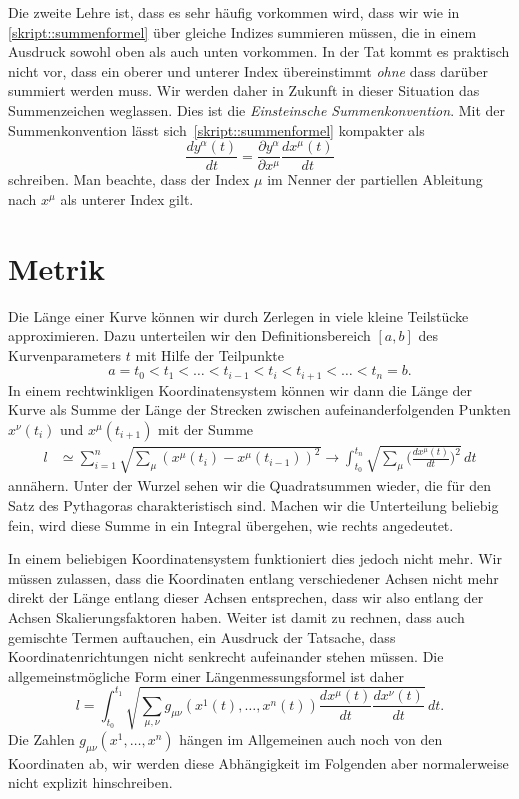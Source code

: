 Die zweite Lehre ist, dass es sehr häufig vorkommen wird, dass wir
wie in 
\eqref{skript::summenformel}
über gleiche Indizes summieren müssen, die in einem Ausdruck sowohl
oben als auch unten vorkommen.
In der Tat kommt es praktisch nicht vor, dass ein oberer und unterer
Index übereinstimmt {\em ohne} dass darüber summiert werden muss.
Wir werden daher in Zukunft in dieser Situation das Summenzeichen weglassen.
Dies ist die {\em Einsteinsche Summenkonvention}.
%
Mit der Summenkonvention lässt sich~\eqref{skript::summenformel} kompakter
als
\begin{equation}
\frac{dy^\alpha(t)}{dt}
=
\frac{\partial y^\alpha}{\partial x^\mu}\frac{dx^\mu(t)}{dt}
\end{equation}
schreiben.
Man beachte, dass der Index $\mu$ im Nenner der partiellen Ableitung nach
$x^\mu$ als unterer Index gilt.

%
%
\section{Metrik%
\label{skript:laengenmessung:section:metrik}}
Die Länge einer Kurve können wir durch Zerlegen in viele kleine Teilstücke
approximieren.
Dazu unterteilen wir den Definitionsbereich $[a,b]$ des Kurvenparameters $t$
mit Hilfe der Teilpunkte
\[
a = t_0 < t_1 < \dots < t_{i-1} < t_i < t_{i+1} < \dots < t_n = b.
\]
In einem rechtwinkligen Koordinatensystem können wir dann die Länge
der Kurve als Summe der Länge der Strecken zwischen aufeinanderfolgenden
Punkten $x^\nu(t_i)$ und $x^\mu(t_{i+1})$ mit der Summe
\begin{align*}
l
&\simeq
\sum_{i=1}^n \sqrt{\sum_{\mu} (x^{\mu}(t_i)-x^{\mu}(t_{i-1}))^2}
\rightarrow
\int_{t_0}^{t_n} \sqrt{\sum_{\mu}\biggl(\frac{dx^{\mu}(t)}{dt}\biggr)^2}\,dt
\end{align*}
annähern.
Unter der Wurzel sehen wir die Quadratsummen wieder, die für den
Satz des Pythagoras charakteristisch sind.
Machen wir die Unterteilung beliebig fein, wird diese Summe in ein
Integral übergehen, wie rechts angedeutet.

In einem beliebigen Koordinatensystem funktioniert dies jedoch nicht mehr.
Wir müssen zulassen, dass die Koordinaten entlang verschiedener
Achsen nicht mehr direkt der Länge entlang dieser Achsen entsprechen,
dass wir also entlang der Achsen Skalierungsfaktoren haben.
Weiter ist damit zu rechnen, dass auch gemischte Termen auftauchen, ein
Ausdruck der Tatsache, dass Koordinatenrichtungen nicht senkrecht aufeinander
stehen müssen.
Die allgemeinstmögliche Form einer Längenmessungsformel ist daher
\begin{equation}
l
=
\int_{t_0}^{t_1}
\sqrt{\sum_{\mu,\nu} g_{\mu\nu}(x^1(t),\dots,x^n(t)) \frac{dx^{\mu}(t)}{dt}\frac{dx^{\nu}(t)}{dt}}\,dt.
\label{skript:kruemmung:metrikformel}
\end{equation}
Die Zahlen $g_{\mu\nu}(x^1,\dots,x^n)$ hängen im Allgemeinen auch noch von
den Koordinaten ab, wir werden diese Abhängigkeit im Folgenden aber
normalerweise nicht explizit hinschreiben.


